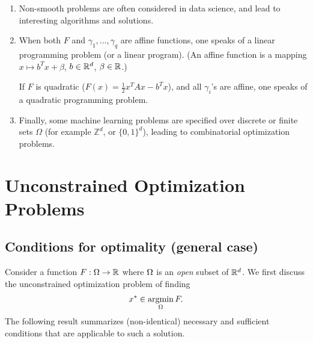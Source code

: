 \begin{enumerate}[label={\bf \arabic*.}]
\begin{enumerate}[label= \arabic*.,wide=10pt]
\item Non-smooth problems are often considered in data science, and lead to interesting algorithms and solutions. 

\item When both $F$ and $\gamma_1, \ldots, \gamma_q$ are affine functions, one speaks of a linear programming problem (or a linear program). (An affine function is a mapping $x\mapsto b^Tx + \beta$, $b\in {\mathbb{R}}^d$, $\beta\in {\mathbb{R}}$.) 

If $F$ is quadratic ($F(x) = \frac12 x^TAx - b^T x$), and all $\gamma_i$'s are affine, one speaks of a quadratic programming problem.

\item 
Finally, some machine learning problems are specified over discrete or finite sets $\Omega$ (for example $\mathbb Z^d$, or $\{0,1\}^d$), leading to combinatorial optimization problems. 
\end{enumerate}


\end{enumerate}





\section{Unconstrained Optimization Problems}
\label{sec:unconstrained}

\subsection{Conditions for optimality (general case)}



Consider a function $F: \Omega \to {\mathbb{R}}$ where $\Omega$ is an {\em open} subset
of ${\mathbb{R}}^d$. We first discuss
 the unconstrained optimization problem of finding
\begin{equation}
\label{eq:min.eq}
x^* \in \operatorname*{argmin}_{\Omega} F.
\end{equation}
The following result summarizes (non-identical) necessary and sufficient conditions that are applicable to such a solution.


